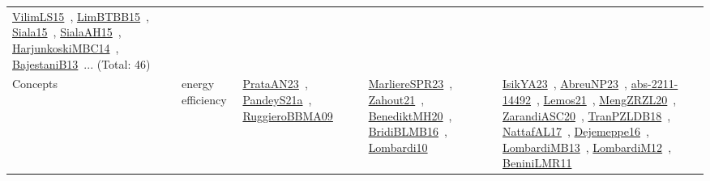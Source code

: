 {\begin{longtable}{lp{3cm}>{\raggedright\arraybackslash}p{6cm}>{\raggedright\arraybackslash}p{6cm}>{\raggedright\arraybackslash}p{8cm}}
\href{../works/VilimLS15.pdf}{VilimLS15}~\cite{VilimLS15}, \href{../works/LimBTBB15.pdf}{LimBTBB15}~\cite{LimBTBB15}, \href{../works/Siala15.pdf}{Siala15}~\cite{Siala15}, \href{../works/SialaAH15.pdf}{SialaAH15}~\cite{SialaAH15}, \href{../works/HarjunkoskiMBC14.pdf}{HarjunkoskiMBC14}~\cite{HarjunkoskiMBC14}, \href{../works/BajestaniB13.pdf}{BajestaniB13}~\cite{BajestaniB13}... (Total: 46)\\
Concepts & energy efficiency & \href{../works/PrataAN23.pdf}{PrataAN23}~\cite{PrataAN23}, \href{../works/PandeyS21a.pdf}{PandeyS21a}~\cite{PandeyS21a}, \href{../works/RuggieroBBMA09.pdf}{RuggieroBBMA09}~\cite{RuggieroBBMA09} & \href{../works/MarliereSPR23.pdf}{MarliereSPR23}~\cite{MarliereSPR23}, \href{../works/Zahout21.pdf}{Zahout21}~\cite{Zahout21}, \href{../works/BenediktMH20.pdf}{BenediktMH20}~\cite{BenediktMH20}, \href{../works/BridiBLMB16.pdf}{BridiBLMB16}~\cite{BridiBLMB16}, \href{../works/Lombardi10.pdf}{Lombardi10}~\cite{Lombardi10} & \href{../works/IsikYA23.pdf}{IsikYA23}~\cite{IsikYA23}, \href{../works/AbreuNP23.pdf}{AbreuNP23}~\cite{AbreuNP23}, \href{../works/abs-2211-14492.pdf}{abs-2211-14492}~\cite{abs-2211-14492}, \href{../works/Lemos21.pdf}{Lemos21}~\cite{Lemos21}, \href{../works/MengZRZL20.pdf}{MengZRZL20}~\cite{MengZRZL20}, \href{../works/ZarandiASC20.pdf}{ZarandiASC20}~\cite{ZarandiASC20}, \href{../works/TranPZLDB18.pdf}{TranPZLDB18}~\cite{TranPZLDB18}, \href{../works/NattafAL17.pdf}{NattafAL17}~\cite{NattafAL17}, \href{../works/Dejemeppe16.pdf}{Dejemeppe16}~\cite{Dejemeppe16}, \href{../works/LombardiMB13.pdf}{LombardiMB13}~\cite{LombardiMB13}, \href{../works/LombardiM12.pdf}{LombardiM12}~\cite{LombardiM12}, \href{../works/BeniniLMR11.pdf}{BeniniLMR11}~\cite{BeniniLMR11}\\

\end{longtable}}
